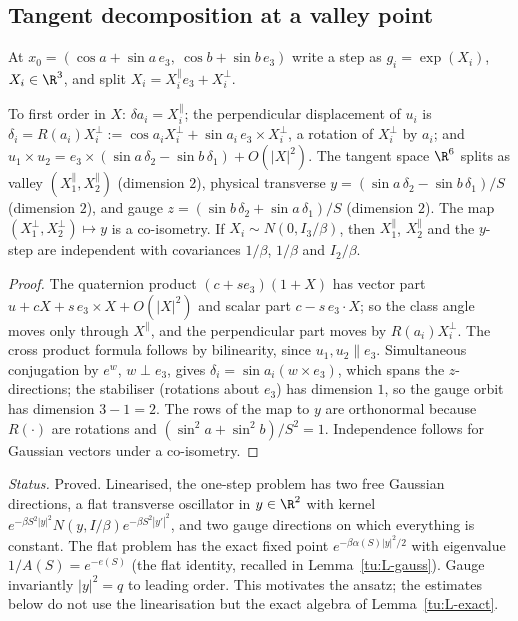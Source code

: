 \subsection{Tangent decomposition at a valley point}

At $x_0=(\cos a+\sin a\,e_3,\ \cos b+\sin b\,e_3)$ write a step as $g_i=\exp(X_i)$, $X_i\in\R^3$, and
split $X_i=X_i^\parallel e_3+X_i^\perp$.

\begin{lemma}\label{tu:L-tangent}
To first order in $X$: $\delta a_i=X_i^\parallel$; the perpendicular displacement of $u_i$ is
$\delta_i=R(a_i)X_i^\perp:=\cos a_iX_i^\perp+\sin a_i\,e_3\times X_i^\perp$, a rotation of $X_i^\perp$
by $a_i$; and $u_1\times u_2=e_3\times(\sin a\,\delta_2-\sin b\,\delta_1)+O(|X|^2)$. The tangent space
$\R^6$ splits as valley $(X_1^\parallel,X_2^\parallel)$ (dimension $2$), physical transverse
$y=(\sin a\,\delta_2-\sin b\,\delta_1)/S$ (dimension $2$), and gauge
$z=(\sin b\,\delta_2+\sin a\,\delta_1)/S$ (dimension $2$). The map $(X_1^\perp,X_2^\perp)\mapsto y$
is a co-isometry. If $X_i\sim N(0,I_3/\beta)$, then $X_1^\parallel$, $X_2^\parallel$ and the $y$-step are
independent with covariances $1/\beta$, $1/\beta$ and $I_2/\beta$.
\end{lemma}

\begin{proof}
The quaternion product $(c+s e_3)(1+X)$ has vector part $u+cX+s\,e_3\times X+O(|X|^2)$ and scalar part
$c-s\,e_3\cdot X$; so the class angle moves only through $X^\parallel$, and the perpendicular part moves
by $R(a_i)X_i^\perp$. The cross product formula follows by bilinearity, since $u_1,u_2\parallel e_3$.
Simultaneous conjugation by $e^{w}$, $w\perp e_3$, gives $\delta_i=\sin a_i(w\times e_3)$, which spans
the $z$-directions; the stabiliser (rotations about $e_3$) has dimension $1$, so the gauge orbit has
dimension $3-1=2$. The rows of the map to $y$ are orthonormal because $R(\cdot)$ are rotations and
$(\sin^2a+\sin^2b)/S^2=1$. Independence follows for Gaussian vectors under a co-isometry.
\end{proof}

\noindent\emph{Status.} Proved. Linearised, the one-step problem has two free Gaussian directions, a
flat transverse oscillator in $y\in\R^2$ with kernel $e^{-\beta S^2|y|^2}N(y,I/\beta)e^{-\beta S^2|y'|^2}$,
and two gauge directions on which everything is constant. The flat problem has the exact fixed point
$e^{-\beta\alpha(S)|y|^2/2}$ with eigenvalue $1/A(S)=e^{-e(S)}$ (the flat identity, recalled in
Lemma~\ref{tu:L-gauss}). Gauge invariantly $|y|^2=q$ to leading order. This motivates the ansatz; the
estimates below do not use the linearisation but the exact algebra of Lemma~\ref{tu:L-exact}.

